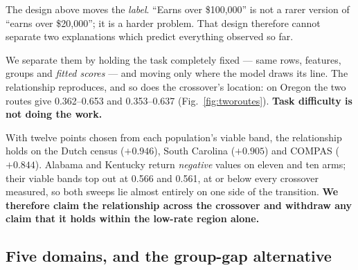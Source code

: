 \documentclass[conference]{IEEEtran}
\begin{document}
The design above moves the \emph{label}. ``Earns over \$100{,}000'' is not a rarer version of
``earns over \$20{,}000''; it is a harder problem. That design therefore cannot separate two
explanations which predict everything observed so far.

We separate them by holding the task completely fixed --- same rows, features, groups and
\emph{fitted scores} --- and moving only where the model draws its line. The relationship
reproduces, and so does the crossover's location: on Oregon the two routes give 0.362--0.653
and 0.353--0.637 (Fig.~\ref{fig:tworoutes}). \textbf{Task difficulty is not doing the work.}

With twelve points chosen from each population's viable band, the relationship holds on the
Dutch census ($+0.946$), South Carolina ($+0.905$) and COMPAS ($+0.844$). Alabama and Kentucky
return \emph{negative} values on eleven and ten arms; their viable bands top out at 0.566 and
0.561, at or below every crossover measured, so both sweeps lie almost entirely on one side of
the transition. \textbf{We therefore claim the relationship across the crossover and withdraw
any claim that it holds within the low-rate region alone.}

\subsection{Five domains, and the group-gap alternative}
\end{document}
